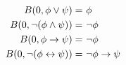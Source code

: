   $\begin{aligned}
    B(0, \phi \lor \psi) =&\  \phi\\ 
    B(0, \lnot (\phi \land \psi)) =&\  \lnot \phi\\ 
    B(0, \phi \to \psi) =&\  \lnot \phi\\ 
    B(0, \lnot (\phi \leftrightarrow \psi)) =&\  \lnot \phi \to \psi
  \end{aligned}$